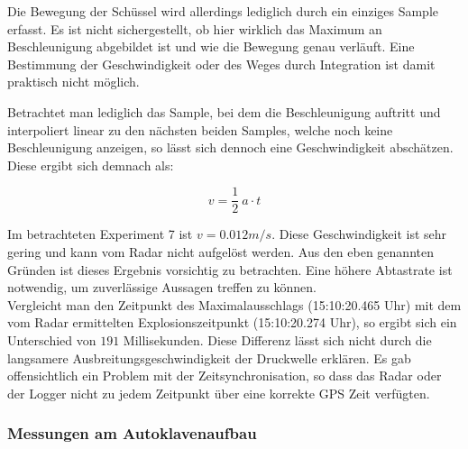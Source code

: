 \documentclass[12pt,a4paper,twoside,BCOR=12.5mm]{scrartcl}
\begin{document}
Die Bewegung der Schüssel wird allerdings lediglich durch ein einziges Sample erfasst. Es ist nicht sichergestellt, ob hier wirklich das Maximum an Beschleunigung abgebildet ist und wie die Bewegung genau verläuft. Eine Bestimmung der Geschwindigkeit oder des Weges durch Integration ist damit praktisch nicht möglich. 


Betrachtet man lediglich das Sample, bei dem die Beschleunigung auftritt und interpoliert linear zu den nächsten beiden Samples, welche noch keine Beschleunigung anzeigen, so lässt sich dennoch eine Geschwindigkeit abschätzen. Diese ergibt sich demnach als:

\begin{equation}
v = \frac{1}{2} ~a \cdot t
\end{equation}

Im betrachteten Experiment 7 ist $v = 0.012 m/s$. Diese Geschwindigkeit ist sehr gering und kann vom Radar nicht aufgelöst werden. Aus den eben genannten Gründen ist dieses Ergebnis vorsichtig zu betrachten. Eine höhere Abtastrate ist notwendig, um zuverlässige Aussagen treffen zu können.\\


Vergleicht man den Zeitpunkt des Maximalausschlags (15:10:20.465 Uhr) mit dem vom Radar ermittelten Explosionszeitpunkt (15:10:20.274 Uhr), so ergibt sich ein Unterschied von $191$ Millisekunden. Diese Differenz lässt sich nicht durch die langsamere Ausbreitungsgeschwindigkeit der Druckwelle erklären. Es gab offensichtlich ein Problem mit der Zeitsynchronisation, so dass das Radar oder der Logger nicht zu jedem Zeitpunkt über eine korrekte GPS Zeit verfügten. \\





\subsubsection{Messungen am Autoklavenaufbau}
\end{document}
